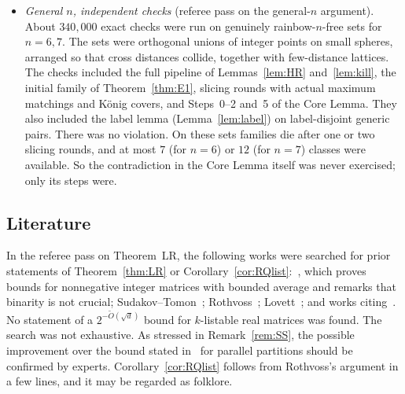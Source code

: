 \begin{itemize}[leftmargin=1.5em]
  equivalence behind Lemma~\ref{lem:HR}, and the family conditions in Lemma~\ref{lem:slicing}(d). There was no violation.
  These checks sampled \emph{arbitrary} integer points, not points of rainbow-$n$-free sets (referee item~X6). So they
  do not test the one implication that uses rainbow-$n$-freeness, namely the label lemma behind G1.
\item \emph{General $n$, independent checks} (referee pass on the general-$n$ argument). About $340{,}000$ exact checks
  were run on genuinely rainbow-$n$-free sets for $n=6,7$. The sets were orthogonal unions of integer points on small
  spheres, arranged so that cross distances collide, together with few-distance lattices. The checks included the
  full pipeline of Lemmas~\ref{lem:HR} and~\ref{lem:kill}, the initial family of Theorem~\ref{thm:E1}, slicing rounds with
  actual maximum matchings and K\"onig covers, and Steps~0--2 and~5 of the Core Lemma. They also included the label
  lemma (Lemma~\ref{lem:label}) on label-disjoint generic pairs. There was no violation. On these sets families die
  after one or two slicing rounds, and at most $7$ (for $n=6$) or $12$ (for $n=7$) classes were available. So the
  contradiction in the Core Lemma itself was never exercised; only its steps were.
\end{itemize}

\subsection{Literature}
In the referee pass on Theorem~LR, the following works were searched for prior statements of
Theorem~\ref{thm:LR} or Corollary~\ref{cor:RQlist}:~\cite{HMST}, which proves bounds for nonnegative
integer matrices with bounded average and remarks that binarity is not crucial; Sudakov--Tomon~\cite{SudakovTomon};
Rothvoss~\cite{Rothvoss}; Lovett~\cite{Lovett}; and works citing~\cite{SingerSudan}. No statement of a
$2^{-\tilde O(\sqrt d)}$ bound for $k$-listable real matrices was found. The search was not exhaustive. As stressed in
Remark~\ref{rem:SS}, the possible improvement over the bound stated in~\cite{SingerSudan} for parallel partitions should
be confirmed by experts. Corollary~\ref{cor:RQlist} follows from Rothvoss's argument in a few lines, and it may be regarded
as folklore.

